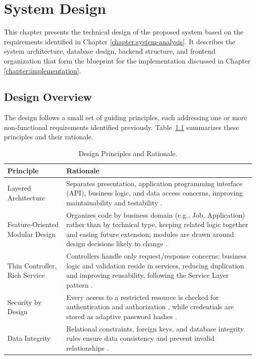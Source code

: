 
\chapter{System Design}
\label{chapter:system-design}
This chapter presents the technical design of the proposed system based on the requirements identified in Chapter \ref{chapter:system-analysis}. It describes the system architecture, database design, backend structure, and frontend organization that form the blueprint for the implementation discussed in Chapter \ref{chapter:implementation}.

\section{Design Overview}
\label{c4:section:design-overview}
The design follows a small set of guiding principles, each addressing one or more non-functional requirements identified previously. Table~\ref{tab:design-principles} summarizes these principles and their rationale.

\begin{table}[H]
	\centering
	\caption{Design Principles and Rationale.}
	\label{tab:design-principles}
	\begin{tabular}{|p{4.2cm}|p{9.8cm}|}
		\hline
		\textbf{Principle} & \textbf{Rationale} \\
		\hline
		
		Layered Architecture &
		Separates presentation, application programming interface (API), business logic, and data access concerns, improving maintainability and testability \cite{fowler2002peaa}. \\
		\hline
		
		Feature-Oriented Modular Design &
		Organizes code by business domain (e.g., Job, Application) rather than by technical type, keeping related logic together and easing future extension; modules are drawn around design decisions likely to change \cite{parnas1972criteria}. \\
		\hline
		
		Thin Controller, Rich Service &
		Controllers handle only request/response concerns; business logic and validation reside in services, reducing duplication and improving reusability, following the Service Layer pattern \cite{fowler2002peaa}. \\
		\hline
		
		Security by Design &
		Every access to a restricted resource is checked for authentication and authorization \cite{saltzer1975protection}, while credentials are stored as adaptive password hashes \cite{provos1999bcrypt, owasp_password_storage}. \\
		\hline
		
		Data Integrity &
		Relational constraints, foreign keys, and database integrity rules ensure data consistency and prevent invalid relationships \cite{codd1970relational}. \\
		\hline
		
	\end{tabular}
\end{table}

